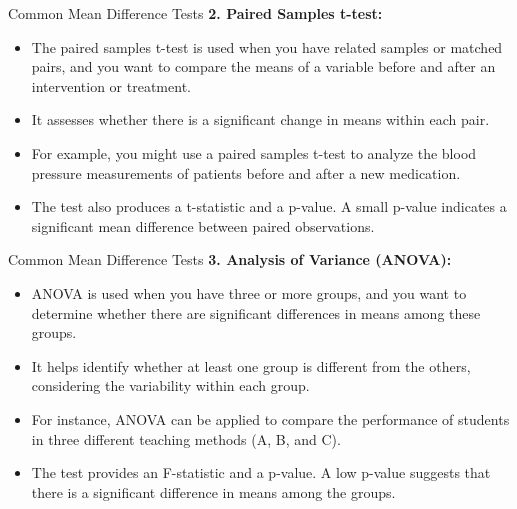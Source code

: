 \documentclass[notes,10pt, aspectratio=169]{beamer}
\begin{document}
\begin{frame}{Common Mean Difference Tests}
\textbf{2. Paired Samples t-test:}
\begin{itemize}
    \item The paired samples t-test is used when you have related samples or matched pairs, and you want to compare the means of a variable before and after an intervention or treatment.
    \item It assesses whether there is a significant change in means within each pair.
    \item For example, you might use a paired samples t-test to analyze the blood pressure measurements of patients before and after a new medication.
    \item The test also produces a t-statistic and a p-value. A small p-value indicates a significant mean difference between paired observations.
\end{itemize}
\end{frame}

\begin{frame}{Common Mean Difference Tests}
\textbf{3. Analysis of Variance (ANOVA):}
\begin{itemize}
    \item ANOVA is used when you have three or more groups, and you want to determine whether there are significant differences in means among these groups.
    \item It helps identify whether at least one group is different from the others, considering the variability within each group.
    \item For instance, ANOVA can be applied to compare the performance of students in three different teaching methods (A, B, and C).
    \item The test provides an F-statistic and a p-value. A low p-value suggests that there is a significant difference in means among the groups.
\end{itemize}
\end{frame}
\end{document}
